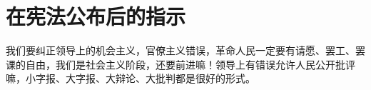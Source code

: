 \section[在宪法公布后的指示（一九五四年六月）]{在宪法公布后的指示}


我们要纠正领导上的机会主义，官僚主义错误，革命人民一定要有请愿、罢工、罢课的自由，我们是社会主义阶段，还要前进嘛！领导上有错误允许人民公开批评嘛，小字报、大字报、大辩论、大批判都是很好的形式。


